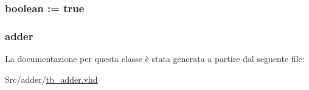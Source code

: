 \hypertarget{classtb__adder_1_1behavior_ae53b6cfbb1b5d32c932c417636d6ac3c}{
\subsubsection[{use\+\_\+custom}]{ {\bfseries \textcolor{vhdlchar}{boolean}\textcolor{vhdlchar}{ }\textcolor{vhdlchar}{ }\textcolor{vhdlchar}{\+:}\textcolor{vhdlchar}{=}\textcolor{vhdlchar}{ }\textcolor{vhdlchar}{ }\textcolor{vhdlchar}{ }\textcolor{vhdlchar}{ }\textcolor{vhdlchar}{true}\textcolor{vhdlchar}{ }} \hspace{0.3cm}{\ttfamily [Constant]}}}\label{classtb__adder_1_1behavior_ae53b6cfbb1b5d32c932c417636d6ac3c}
\hypertarget{classtb__adder_1_1behavior_a1619316ad715601eb5d3559db829ac05}{
\subsubsection[{uut}]{ {\bfseries \textcolor{vhdlchar}{adder}\textcolor{vhdlchar}{ }} \hspace{0.3cm}{\ttfamily [Instantiation]}}}\label{classtb__adder_1_1behavior_a1619316ad715601eb5d3559db829ac05}


La documentazione per questa classe è stata generata a partire dal seguente file\+:\begin{DoxyCompactItemize}
\item 
Src/adder/\hyperlink{tb__adder_8vhd}{tb\+\_\+adder.\+vhd}\end{DoxyCompactItemize}
